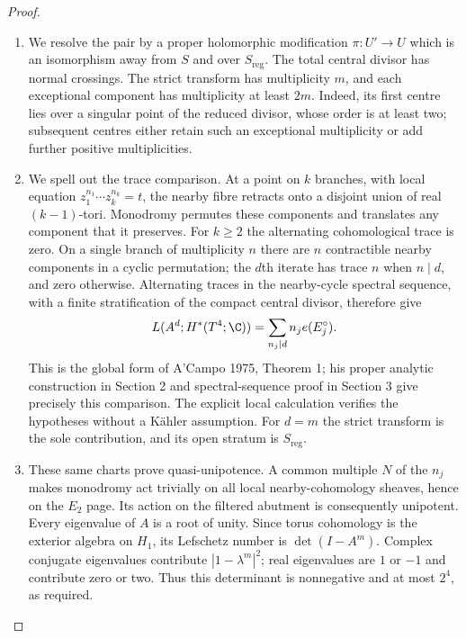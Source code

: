 \begin{proof}

\begin{enumerate}[label={$\langle1\rangle$\arabic*.},leftmargin=*]
\item We resolve the pair by a proper holomorphic modification
$\pi:U'\to U$ which is an isomorphism away from $S$ and over
$S_{\mathrm{reg}}$. The total central divisor has normal crossings.
The strict transform has multiplicity $m$, and each exceptional
component has multiplicity at least $2m$. Indeed, its first centre
lies over a singular point of the reduced divisor, whose order is
at least two; subsequent centres either retain such an exceptional
multiplicity or add further positive multiplicities.

\item We spell out the trace comparison. At a point on $k$ branches,
with local equation $z_1^{n_1}\cdots z_k^{n_k}=t$, the nearby
fibre retracts onto a disjoint union of real $(k-1)$-tori.
Monodromy permutes these components and translates any component
that it preserves. For $k\ge2$ the alternating cohomological
trace is zero. On a single branch of multiplicity $n$ there are
$n$ contractible nearby components in a cyclic permutation;
the $d$th iterate has trace $n$ when $n\mid d$, and zero otherwise.
Alternating traces in the nearby-cycle spectral sequence, with a
finite stratification of the compact central divisor, therefore give
\[
 L(A^d;H^*(T^4;\C))=\sum_{n_j\mid d}n_j e(E_j^\circ).
\]
This is the global form of A'Campo 1975, Theorem 1; his proper
analytic construction in Section 2 and spectral-sequence proof in
Section 3 give precisely this comparison. The explicit local
calculation verifies the hypotheses without a Kähler assumption.
For $d=m$ the strict transform is the sole contribution, and its
open stratum is $S_{\mathrm{reg}}$.

\item These same charts prove quasi-unipotence. A common multiple $N$
of the $n_j$ makes monodromy act trivially on all local
nearby-cohomology sheaves, hence on the $E_2$ page. Its action
on the filtered abutment is consequently unipotent. Every
eigenvalue of $A$ is a root of unity. Since torus cohomology is
the exterior algebra on $H_1$, its Lefschetz number is
$\det(I-A^m)$. Complex conjugate eigenvalues contribute
$|1-\lambda^m|^2$; real eigenvalues are $1$ or $-1$ and
contribute zero or two. Thus this determinant is nonnegative
and at most $2^4$, as required.

\end{enumerate}
\end{proof}
